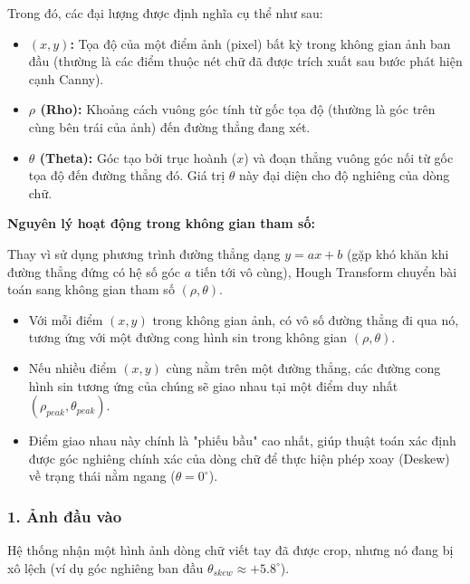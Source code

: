 Trong đó, các đại lượng được định nghĩa cụ thể như sau:
\begin{itemize}
    \item \textbf{$(x, y)$:} Tọa độ của một điểm ảnh (pixel) bất kỳ trong không gian ảnh ban đầu (thường là các điểm thuộc nét chữ đã được trích xuất sau bước phát hiện cạnh Canny).
    \item \textbf{$\rho$ (Rho):} Khoảng cách vuông góc tính từ gốc tọa độ (thường là góc trên cùng bên trái của ảnh) đến đường thẳng đang xét.
    \item \textbf{$\theta$ (Theta):} Góc tạo bởi trục hoành ($x$) và đoạn thẳng vuông góc nối từ gốc tọa độ đến đường thẳng đó. Giá trị $\theta$ này đại diện cho độ nghiêng của dòng chữ.
\end{itemize}


\textbf{Nguyên lý hoạt động trong không gian tham số:}

Thay vì sử dụng phương trình đường thẳng dạng $y = ax + b$ (gặp khó khăn khi đường thẳng đứng có hệ số góc $a$ tiến tới vô cùng), Hough Transform chuyển bài toán sang không gian tham số $(\rho, \theta)$. 

\begin{itemize}
    \item Với mỗi điểm $(x, y)$ trong không gian ảnh, có vô số đường thẳng đi qua nó, tương ứng với một đường cong hình sin trong không gian $(\rho, \theta)$.
    \item Nếu nhiều điểm $(x, y)$ cùng nằm trên một đường thẳng, các đường cong hình sin tương ứng của chúng sẽ giao nhau tại một điểm duy nhất $(\rho_{peak}, \theta_{peak})$.
    \item Điểm giao nhau này chính là "phiếu bầu" cao nhất, giúp thuật toán xác định được góc nghiêng chính xác của dòng chữ để thực hiện phép xoay (Deskew) về trạng thái nằm ngang ($\theta = 0^\circ$).
\end{itemize}

\subsubsection*{1. Ảnh đầu vào}

Hệ thống nhận một hình ảnh dòng chữ viết tay đã được crop, nhưng nó đang bị xô lệch (ví dụ góc nghiêng ban đầu $\theta_{skew} \approx +5.8^\circ$).

